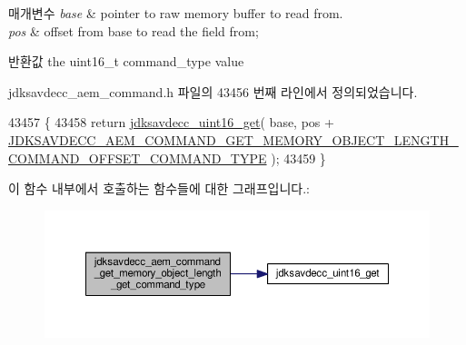 \begin{DoxyParams}{매개변수}
{\em base} & pointer to raw memory buffer to read from. \\
\hline
{\em pos} & offset from base to read the field from; \\
\hline
\end{DoxyParams}
\begin{DoxyReturn}{반환값}
the uint16\+\_\+t command\+\_\+type value 
\end{DoxyReturn}


jdksavdecc\+\_\+aem\+\_\+command.\+h 파일의 43456 번째 라인에서 정의되었습니다.


\begin{DoxyCode}
43457 \{
43458     \textcolor{keywordflow}{return} \hyperlink{group__endian_ga3fbbbc20be954aa61e039872965b0dc9}{jdksavdecc\_uint16\_get}( base, pos + 
      \hyperlink{group__command__get__memory__object__length_ga5c1b9fdd7e368b686a3af8c519adcb4f}{JDKSAVDECC\_AEM\_COMMAND\_GET\_MEMORY\_OBJECT\_LENGTH\_COMMAND\_OFFSET\_COMMAND\_TYPE}
       );
43459 \}
\end{DoxyCode}


이 함수 내부에서 호출하는 함수들에 대한 그래프입니다.\+:
\nopagebreak
\begin{figure}[H]
\begin{center}
\leavevmode
\includegraphics[width=350pt]{group__command__get__memory__object__length_ga2b5e3e425224548831c5a254e36b6be7_cgraph}
\end{center}
\end{figure}


